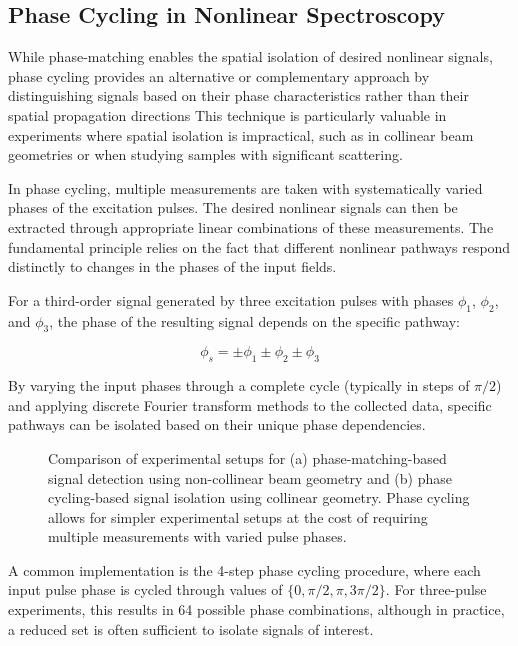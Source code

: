 \subsection{Phase Cycling in Nonlinear Spectroscopy}
\label{subsec:phase_cycling}

\noindent While phase-matching enables the spatial isolation of desired nonlinear signals, phase cycling provides an alternative or complementary approach by distinguishing signals based on their phase characteristics rather than their spatial propagation directions %
This technique is particularly valuable in experiments where spatial isolation is impractical, such as in collinear beam geometries or when studying samples with significant scattering.

\noindent In phase cycling, multiple measurements are taken with systematically varied phases of the excitation pulses. The desired nonlinear signals can then be extracted through appropriate linear combinations of these measurements. The fundamental principle relies on the fact that different nonlinear pathways respond distinctly to changes in the phases of the input fields.

\noindent For a third-order signal generated by three excitation pulses with phases $\phi_1$, $\phi_2$, and $\phi_3$, the phase of the resulting signal depends on the specific pathway:

\begin{equation}
    \phi_s = \pm\phi_1 \pm\phi_2 \pm\phi_3
    \label{eq:phase_cycling}
\end{equation}

\noindent By varying the input phases through a complete cycle (typically in steps of $\pi/2$) and applying discrete Fourier transform methods to the collected data, specific pathways can be isolated based on their unique phase dependencies.

\begin{figure}[ht]
    \centering
    \caption{Comparison of experimental setups for (a) phase-matching-based signal detection using non-collinear beam geometry and (b) phase cycling-based signal isolation using collinear geometry. Phase cycling allows for simpler experimental setups at the cost of requiring multiple measurements with varied pulse phases.}
    \label{fig:phase_cycling_vs_matching}
\end{figure}

\noindent A common implementation is the 4-step phase cycling procedure, where each input pulse phase is cycled through values of $\{0, \pi/2, \pi, 3\pi/2\}$. For three-pulse experiments, this results in 64 possible phase combinations, although in practice, a reduced set is often sufficient to isolate signals of interest.

